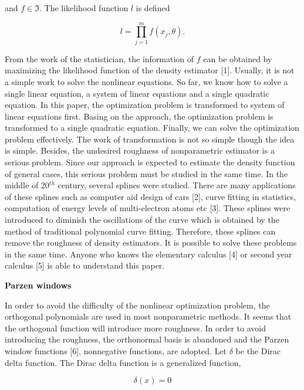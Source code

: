 \documentclass [18pt]{article}
\begin{document}
\noindent
and $f \in \Im $. The likelihood function $l$ is defined


\begin{equation}
\label{eq2}
l = \prod\limits_{j = 1}^m {f(x_j ,\theta )} .
\end{equation}



From the work of the statistician, the information of $f$ can be obtained by
maximizing the likelihood function of the density estimator [1]. Usually, it
is not a simple work to solve the nonlinear equations. So far, we know how
to solve a single linear equation, a system of linear equations and a single
quadratic equation. In this paper, the optimization problem is transformed
to system of linear equations first. Basing on the approach, the
optimization problem is transformed to a single quadratic equation. Finally,
we can solve the optimization problem effectively. The work of
transformation is not so simple though the idea is simple. Besides, the
undesired roughness of nonparametric estimator is a serious problem. Since
our approach is expected to estimate the density function of general cases,
this serious problem must be studied in the same time. In the middle of
20$^{th}$ century, several splines were studied. There are many applications
of these splines such as computer aid design of cars [2], curve fitting in
statistics, computation of energy levels of multi-electron atoms etc [3].
These splines were introduced to diminish the oscillations of the curve
which is obtained by the method of traditional polynomial curve fitting.
Therefore, these splines can remove the roughness of density estimators. It
is possible to solve these problems in the same time. Anyone who knows the
elementary calculus [4] or second year calculus [5] is able to understand
this paper.

\textbf{Parzen windows}

In order to avoid the difficulty of the nonlinear optimization problem, the
orthogonal polynomials are used in most nonparametric methods. It seems that
the orthogonal function will introduce more roughness. In order to avoid
introducing the roughness, the orthonormal basis is abandoned and the Parzen
window functions [6], nonnegative functions, are adopted. Let $\delta $ be
the Dirac delta function. The Dirac delta function is a generalized
function,


\begin{equation}
\label{eq3}
\delta (x) = 0
\end{equation}
\end{document}
